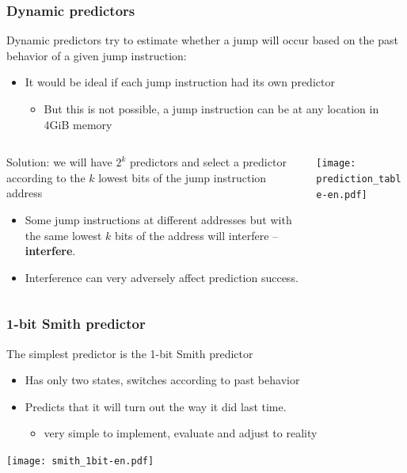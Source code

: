 \documentclass{beamer}
\begin{document}
\begin{frame}
\frametitle{Dynamic predictors}

\small
Dynamic predictors try to estimate whether a jump will occur based on the past behavior of a given jump instruction:
\begin{itemize}
\item It would be ideal if each jump instruction had its own predictor
\begin{itemize}
\small
\item But this is not possible, a jump instruction can be at any location in 4GiB memory
\end{itemize}
\end{itemize}


\begin{columns}[T]
\begin{column}{0.5\textwidth}
\small
Solution: we will have $2^k$ predictors and select a predictor according to the $k$ lowest bits of the jump instruction address
\begin{itemize}
\item Some jump instructions at different addresses but with the same lowest $k$ bits of the address will interfere -- \textbf{interfere}.
\item Interference can very adversely affect prediction success.
\end{itemize}
\end{column}
\begin{column}{0.5\textwidth}
\texttt{[image: prediction\_table-en.pdf]}
\end{column}
\end{columns}

\end{frame}


\begin{frame}
\frametitle{1-bit Smith predictor}

The simplest predictor is the 1-bit Smith predictor
\begin{itemize}
\item Has only two states, switches according to past behavior
\item Predicts that it will turn out the way it did last time.
\begin{itemize}
\item very simple to implement, evaluate and adjust to reality
\end{itemize}
\end{itemize}

\begin{center}
\texttt{[image: smith\_1bit-en.pdf]}
\end{center}

\end{frame}
\end{document}
